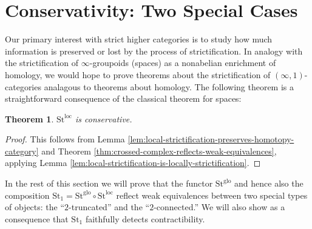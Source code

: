 \documentclass[12pt]{article}
\newtheorem{theorem}{Theorem}[section]
\theoremstyle{definition}
\newcommand{\st}{\text{St}}
\newcommand{\leftone}{\st^{\text{loc}}}
\newcommand{\lefttwo}{\st^{\text{glo}}}
\begin{document}
\section{Conservativity: Two Special Cases}
	Our primary interest with strict higher categories is to study how much information is preserved or lost by the process of strictification. In analogy with the strictification of $\infty$-groupoids (spaces) as a nonabelian enrichment of homology, we would hope to prove theorems about the strictification of $(\infty,1)$-categories analagous to theorems about homology. The following theorem is a straightforward consequence of the classical theorem for spaces:
	\begin{theorem}
		$\leftone$ is conservative.
	\end{theorem}
	\begin{proof}
		This follows from Lemma \ref{lem:local-strictification-preserves-homotopy-category} and Theorem \ref{thm:crossed-complex-reflects-weak-equivalences}, applying Lemma \ref{lem:local-strictification-is-locally-strictification}.
	\end{proof}
	In the rest of this section we will prove that the functor $\lefttwo$ and hence also the composition $\st_1 = \lefttwo \circ \leftone$ reflect weak equivalences between two special types of objects: the ``$2$-truncated'' and the ``$2$-connected.'' We will also show as a consequence that $\st_1$ faithfully detects contractibility.
\end{document}
